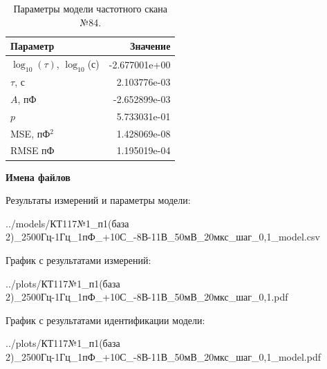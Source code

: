 \begin{table}[!ht]
    \centering
    \caption{Параметры модели частотного скана №84.}
    \begin{tabular}{|l|r|}
        \hline
        Параметр                                       & Значение                  \\ \hline
        $\log_{10}(\tau)$, $\log_{10}$(с)              & -2.677001e+00             \\ \hline
        $\tau$, с                                      & 2.103776e-03              \\ \hline
        $A$, пФ                                        & -2.652899e-03             \\ \hline
        $p$                                            & 5.733031e-01              \\ \hline
        MSE, пФ$^2$                                    & 1.428069e-08              \\ \hline
        RMSE пФ                                        & 1.195019e-04              \\ \hline
    \end{tabular}
    \label{table:frequency_scan_model_84}
\end{table}

\textbf{Имена файлов}

Результаты измерений и параметры модели:

\scriptsize../models/КТ117№1\_п1(база 2)\_2500Гц-1Гц\_1пФ\_+10С\_-8В-11В\_50мВ\_20мкс\_шаг\_0,1\_model.csv
\normalsize

График с результатами измерений:

\scriptsize../plots/КТ117№1\_п1(база 2)\_2500Гц-1Гц\_1пФ\_+10С\_-8В-11В\_50мВ\_20мкс\_шаг\_0,1.pdf
\normalsize

График с результатами идентификации модели:

\scriptsize../plots/КТ117№1\_п1(база 2)\_2500Гц-1Гц\_1пФ\_+10С\_-8В-11В\_50мВ\_20мкс\_шаг\_0,1\_model.pdf
\normalsize

